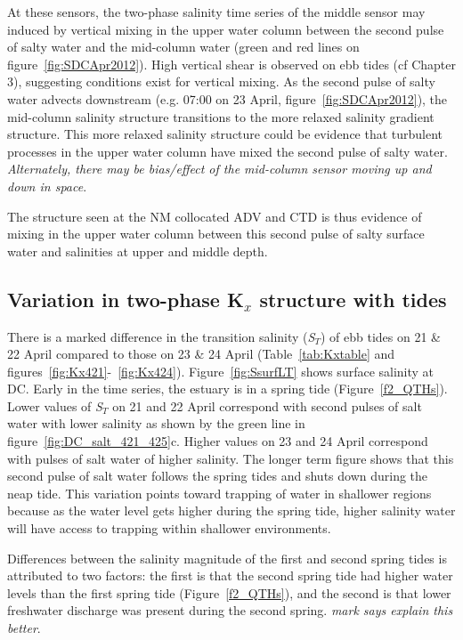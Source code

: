 At these sensors, the two-phase salinity time series of the middle sensor may induced by vertical mixing in the upper water column between the second pulse of salty water and the mid-column water (green and red lines on figure~\ref{fig:SDCApr2012}). High vertical shear is observed on ebb tides (cf Chapter 3), suggesting conditions exist for vertical mixing. As the second pulse of salty water advects downstream (e.g. 07:00 on 23 April, figure~\ref{fig:SDCApr2012}), the mid-column salinity structure transitions to the more relaxed salinity gradient structure. This more relaxed salinity structure could be evidence that turbulent processes in the upper water column have mixed the second pulse of salty water.  \emph{Alternately, there may be bias/effect of the mid-column sensor moving up and down in space}.  

The structure seen at the NM collocated ADV and CTD is thus evidence of mixing in the upper water column between this second pulse of salty surface water and salinities at upper and middle depth.

\subsection{Variation in two-phase K$_x$ structure with tides}
There is a marked difference in the transition salinity (\emph{S$_T$}) of ebb tides on 21 \& 22 April compared to those on 23 \& 24 April (Table~\ref{tab:Kxtable} and figures~\ref{fig:Kx421}-~\ref{fig:Kx424}). Figure~\ref{fig:SsurfLT} shows surface salinity at DC. Early in the time series, the estuary is in a spring tide (Figure~\ref{f2_QTHs}). Lower values of \emph{S$_T$} on 21 and 22 April correspond with second pulses of salt water with lower salinity as shown by the green line in figure~\ref{fig:DC_salt_421_425}c. Higher values on 23 and 24 April correspond with pulses of salt water of higher salinity. The longer term figure shows that this second pulse of salt water follows the spring tides and shuts down during the neap tide. This variation points toward trapping of water in shallower regions because as the water level gets higher during the spring tide, higher salinity water will have access to trapping within shallower environments.

Differences between the salinity magnitude of the first and second spring tides is attributed to two factors: the first is that the second spring tide had higher water levels than the first spring tide (Figure~\ref{f2_QTHs}), and the second is that lower freshwater discharge was present during the second spring.  \emph{mark says explain this better}. 

